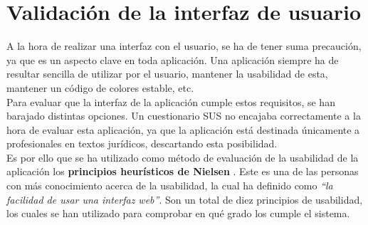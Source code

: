 \section{Validación de la interfaz de usuario}

A la hora de realizar una interfaz con el usuario, se ha de tener suma precaución, ya que es un aspecto clave en toda aplicación. Una aplicación siempre ha de resultar sencilla de utilizar por el usuario, mantener la usabilidad de esta, mantener un código de colores estable, etc.
\\

Para evaluar que la interfaz de la aplicación cumple estos requisitos, se han barajado distintas opciones. Un cuestionario SUS \cite{sus} no encajaba correctamente a la hora de evaluar esta aplicación, ya que la aplicación está destinada únicamente a profesionales en textos jurídicos, descartando esta posibilidad. 
\\

Es por ello que se ha utilizado como método de evaluación de la usabilidad de la aplicación los {\bf principios heurísticos de Nielsen} \cite{nielsen}. Este es una de las personas con más conocimiento acerca de la usabilidad, la cual ha definido como {\it ``la facilidad de usar una interfaz web''}. Son un total de diez principios de usabilidad, los cuales se han utilizado para comprobar en qué grado los cumple el sistema.

